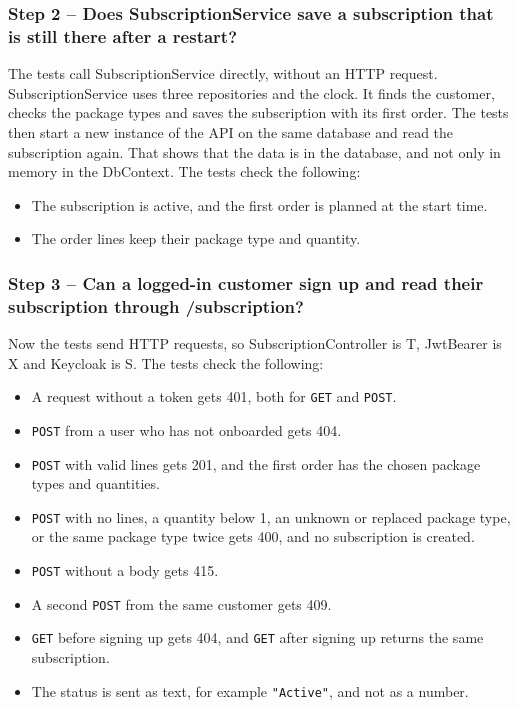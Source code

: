 \documentclass[a4paper,11pt]{article}
\begin{document}
\subsubsection*{Step 2 -- Does SubscriptionService save a subscription that is still there after a restart?}
The tests call SubscriptionService directly, without an HTTP request. SubscriptionService uses three repositories and the clock. It finds the customer, checks the package types and saves the subscription with its first order. The tests then start a new instance of the API on the same database and read the subscription again. That shows that the data is in the database, and not only in memory in the DbContext. The tests check the following:
\begin{itemize}
  \item The subscription is active, and the first order is planned at the start time.
  \item The order lines keep their package type and quantity.
\end{itemize}

\subsubsection*{Step 3 -- Can a logged-in customer sign up and read their subscription through /subscription?}
Now the tests send HTTP requests, so SubscriptionController is T, JwtBearer is X and Keycloak is S. The tests check the following:
\begin{itemize}
  \item A request without a token gets 401, both for \texttt{GET} and \texttt{POST}.
  \item \texttt{POST} from a user who has not onboarded gets 404.
  \item \texttt{POST} with valid lines gets 201, and the first order has the chosen package types and quantities.
  \item \texttt{POST} with no lines, a quantity below 1, an unknown or replaced package type, or the same package type twice gets 400, and no subscription is created.
  \item \texttt{POST} without a body gets 415.
  \item A second \texttt{POST} from the same customer gets 409.
  \item \texttt{GET} before signing up gets 404, and \texttt{GET} after signing up returns the same subscription.
  \item The status is sent as text, for example \texttt{"Active"}, and not as a number.
\end{itemize}
\end{document}
